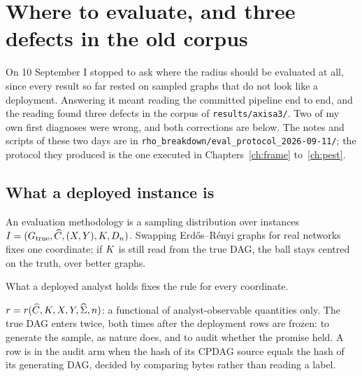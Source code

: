 \chapter{Where to evaluate, and three defects in the old corpus}
\label{ch:where}

On 10 September I stopped to ask where the radius should be evaluated at all, since every result so far rested on
sampled graphs that do not look like a deployment. Answering it meant reading the committed pipeline end to end, and
the reading found three defects in the corpus of \texttt{results/axisa3/}. Two of my own first diagnoses were wrong,
and both corrections are below. The notes and scripts of these two days are in
\texttt{rho\_breakdown/eval\_protocol\_2026-09-11/}; the protocol they produced is the one executed in
Chapters~\ref{ch:frame} to~\ref{ch:pest}.

\begin{antes}
\end{antes}

\section{What a deployed instance is}

\begin{ideia}
An evaluation methodology is a sampling distribution over instances $I = (G_{\mathrm{true}}, \widehat{C}, (X,Y), K, D_n)$.
Swapping Erdős--Rényi graphs for real networks fixes one coordinate; if $K$ is still read from the true DAG, the ball
stays centred on the truth, over better graphs.
\end{ideia}

What a deployed analyst holds fixes the rule for every coordinate.

\begin{formulabox}
$r = r(\widehat{C}, K, X, Y, \widehat\Sigma, n)$: a functional of analyst-observable quantities only. The true DAG enters
twice, both times after the deployment rows are frozen: to generate the sample, as nature does, and to audit whether the
promise held. A row is in the audit arm when the hash of its CPDAG source equals the hash of its generating DAG, decided
by comparing bytes rather than reading a label.
\end{formulabox}

